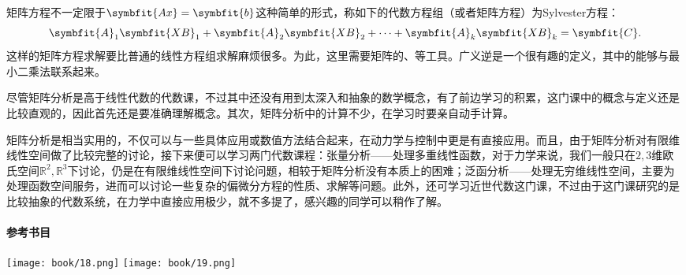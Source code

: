 矩阵方程不一定限于$\symbfit{Ax}=\symbfit{b}$这种简单的形式，称如下的代数方程组（或者矩阵方程）为Sylvester方程：
\[
    \symbfit{A}_1\symbfit{XB}_1+\symbfit{A}_2\symbfit{XB}_2+\cdots+\symbfit{A}_k\symbfit{XB}_k=\symbfit{C}
    .\]
这样的矩阵方程求解要比普通的线性方程组求解麻烦很多。为此，这里需要矩阵的、等工具。广义逆是一个很有趣的定义，其中的能够与最小二乘法联系起来。

尽管矩阵分析是高于线性代数的代数课，不过其中还没有用到太深入和抽象的数学概念，有了前边学习的积累，这门课中的概念与定义还是比较直观的，因此首先还是要准确理解概念。其次，矩阵分析中的计算不少，在学习时要亲自动手计算。

矩阵分析是相当实用的，不仅可以与一些具体应用或数值方法结合起来，在动力学与控制中更是有直接应用。而且，由于矩阵分析对有限维线性空间做了比较完整的讨论，接下来便可以学习两门代数课程：张量分析——处理多重线性函数，对于力学来说，我们一般只在$2,3$维欧氏空间$\mathbb{R}^2,\mathbb{R}^3$下讨论，仍是在有限维线性空间下讨论问题，相较于矩阵分析没有本质上的困难；泛函分析——处理无穷维线性空间，主要为处理函数空间服务，进而可以讨论一些复杂的偏微分方程的性质、求解等问题。此外，还可学习近世代数这门课，不过由于这门课研究的是比较抽象的代数系统，在力学中直接应用极少，就不多提了，感兴趣的同学可以稍作了解。

\paragraph{参考书目}

\begin{center}
    \texttt{[image: book/18.png]} \quad
    \texttt{[image: book/19.png]}
\end{center}

